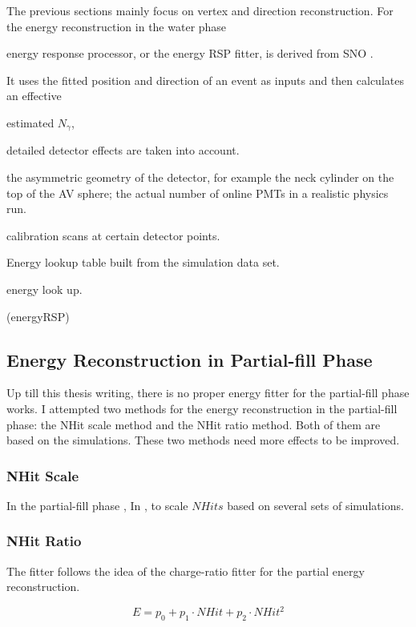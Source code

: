 The previous sections mainly focus on vertex and direction reconstruction. For the energy reconstruction in the water phase 

energy response processor, or the energy RSP fitter, is derived from SNO \cite{boulay2004direct,moffat2001optical}.

It uses the fitted position and direction of an event as inputs and then calculates an effective 

estimated $N_\gamma$,

detailed detector effects are taken into account.

the asymmetric geometry of the detector, for example the neck cylinder on the top of the AV sphere; the actual number of online PMTs in a realistic physics run.





 calibration scans at certain detector points.

Energy lookup table built from the simulation data set.



energy look up\cite{energyRSP}.

(energyRSP)
\subsection{Energy Reconstruction in Partial-fill Phase}
Up till this thesis writing, there is no proper energy fitter for the partial-fill phase works. I attempted two methods for the energy reconstruction in the partial-fill phase: the NHit scale method and the NHit ratio method. Both of them are based on the simulations. These two methods need more effects to be improved.
\subsubsection{NHit Scale}
In the partial-fill phase ,  In \cite{partialEnergy}, 
to scale $NHits$ based on several sets of simulations.




\subsubsection{NHit Ratio}


The fitter follows the idea of the charge-ratio fitter for the partial energy reconstruction\cite{partialEnergyYang}.

\begin{equation}
E = p_0+p_1\cdot NHit+p_2\cdot NHit^2
\end{equation}


